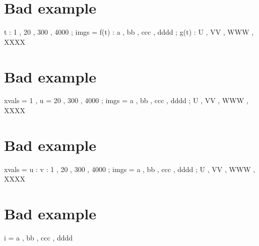 \documentclass{tutodoc}
\begin{document}
\section{Bad example \thesection}

\begin{functable}
               t : 1 , 20 , 300 , 4000 ;
    imgs  = f(t) : a , bb , ccc , dddd ;
            g(t) : U , VV , WWW , XXXX
\end{functable}


\section{Bad example \thesection}

\begin{functable}
    xvals = 1 , u = 20 , 300 , 4000 ;
    imgs  = a , bb , ccc , dddd ;
            U , VV , WWW , XXXX
\end{functable}


\section{Bad example \thesection}

\begin{functable}
    xvals = u : v : 1 , 20 , 300 , 4000 ;
    imgs  = a , bb , ccc , dddd ;
            U , VV , WWW , XXXX
\end{functable}


\section{Bad example \thesection}

\begin{functable}
    i = a , bb , ccc , dddd
\end{functable}
\end{document}
